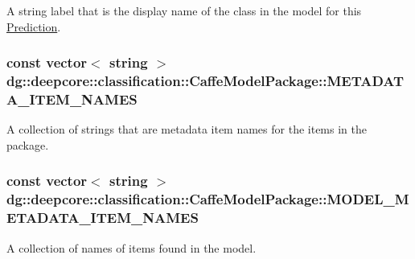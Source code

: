 A string label that is the display name of the class in the model for this \hyperlink{structdg_1_1deepcore_1_1classification_1_1_prediction}{Prediction}. 

\subsubsection[{\texorpdfstring{M\+E\+T\+A\+D\+A\+T\+A\+\_\+\+I\+T\+E\+M\+\_\+\+N\+A\+M\+ES}{METADATA_ITEM_NAMES}}]{\setlength{\rightskip}{0pt plus 5cm}const vector$<$ string $>$ dg\+::deepcore\+::classification\+::\+Caffe\+Model\+Package\+::\+M\+E\+T\+A\+D\+A\+T\+A\+\_\+\+I\+T\+E\+M\+\_\+\+N\+A\+M\+ES\hspace{0.3cm}{\ttfamily [static]}}\hypertarget{group___classification_module_ga0d8174bf9f1ba89932caa3abb73aa4cb}{}\label{group___classification_module_ga0d8174bf9f1ba89932caa3abb73aa4cb}


A collection of strings that are metadata item names for the items in the package. 

\subsubsection[{\texorpdfstring{M\+O\+D\+E\+L\+\_\+\+M\+E\+T\+A\+D\+A\+T\+A\+\_\+\+I\+T\+E\+M\+\_\+\+N\+A\+M\+ES}{MODEL_METADATA_ITEM_NAMES}}]{\setlength{\rightskip}{0pt plus 5cm}const vector$<$ string $>$ dg\+::deepcore\+::classification\+::\+Caffe\+Model\+Package\+::\+M\+O\+D\+E\+L\+\_\+\+M\+E\+T\+A\+D\+A\+T\+A\+\_\+\+I\+T\+E\+M\+\_\+\+N\+A\+M\+ES\hspace{0.3cm}{\ttfamily [static]}}\hypertarget{group___classification_module_ga66d66cfd2c51d9d01f001fc6d55afcaf}{}\label{group___classification_module_ga66d66cfd2c51d9d01f001fc6d55afcaf}


A collection of names of items found in the model. 

